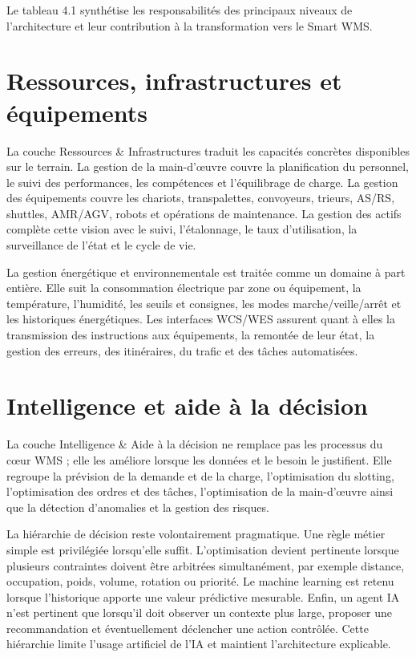 Le tableau 4.1 synthétise les responsabilités des principaux niveaux de l’architecture et leur contribution à la transformation vers le Smart WMS.






\section{Ressources, infrastructures et équipements}

\label{sec:4.7}

La couche Ressources \& Infrastructures traduit les capacités concrètes disponibles sur le terrain. La gestion de la main-d’œuvre couvre la planification du personnel, le suivi des performances, les compétences et l’équilibrage de charge. La gestion des équipements couvre les chariots, transpalettes, convoyeurs, trieurs, AS/RS, shuttles, AMR/AGV, robots et opérations de maintenance. La gestion des actifs complète cette vision avec le suivi, l’étalonnage, le taux d’utilisation, la surveillance de l’état et le cycle de vie.


La gestion énergétique et environnementale est traitée comme un domaine à part entière. Elle suit la consommation électrique par zone ou équipement, la température, l’humidité, les seuils et consignes, les modes marche/veille/arrêt et les historiques énergétiques. Les interfaces WCS/WES assurent quant à elles la transmission des instructions aux équipements, la remontée de leur état, la gestion des erreurs, des itinéraires, du trafic et des tâches automatisées.



\section{Intelligence et aide à la décision}

\label{sec:4.8}

La couche Intelligence \& Aide à la décision ne remplace pas les processus du cœur WMS ; elle les améliore lorsque les données et le besoin le justifient. Elle regroupe la prévision de la demande et de la charge, l’optimisation du slotting, l’optimisation des ordres et des tâches, l’optimisation de la main-d’œuvre ainsi que la détection d’anomalies et la gestion des risques.


La hiérarchie de décision reste volontairement pragmatique. Une règle métier simple est privilégiée lorsqu’elle suffit. L’optimisation devient pertinente lorsque plusieurs contraintes doivent être arbitrées simultanément, par exemple distance, occupation, poids, volume, rotation ou priorité. Le machine learning est retenu lorsque l’historique apporte une valeur prédictive mesurable. Enfin, un agent IA n’est pertinent que lorsqu’il doit observer un contexte plus large, proposer une recommandation et éventuellement déclencher une action contrôlée. Cette hiérarchie limite l’usage artificiel de l’IA et maintient l’architecture explicable.



